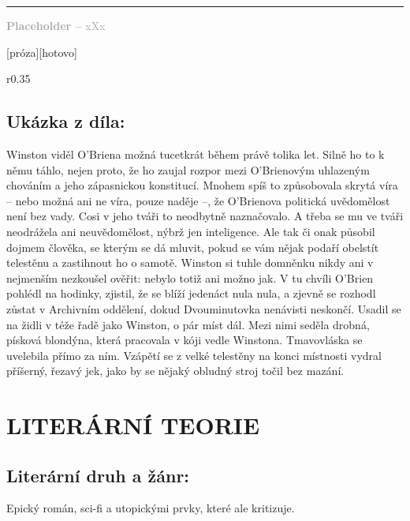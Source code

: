 \documentclass{extarticle} %
\begin{document}
\vfill

\noindent\begin{minipage}{\textwidth}
    \textcolor{darkgray}{\rule{\linewidth}{0.4pt}
    \footnotesize
    \textbf{Placeholder --} xXx
    }
\end{minipage}

\newpage


\changefontsize{7pt}

[próza][hotovo]

\noindent\begin{wrapfigure}{r}{0.35\textwidth}
\tiny

\subsection*{Ukázka z díla:}
\setlength{\parindent}{3pt}\setlength{\parskip}{0.5em}
Winston viděl O’Briena možná tucetkrát během právě tolika let. Silně ho to k němu táhlo, nejen proto, že ho zaujal rozpor mezi O’Brienovým uhlazeným chováním a jeho zápasnickou konstitucí. Mnohem spíš to způsobovala skrytá víra – nebo možná ani ne víra, pouze naděje –, že O’Brienova politická uvědomělost není bez vady. Cosi v jeho tváři to neodbytně naznačovalo. A třeba se mu ve tváři neodrážela ani neuvědomělost, nýbrž jen inteligence. Ale tak či onak působil dojmem člověka, se kterým se dá mluvit, pokud se vám nějak podaří obelstít telestěnu a zastihnout ho o samotě. Winston si tuhle domněnku nikdy ani v nejmenším nezkoušel ověřit: nebylo totiž ani možno jak. V tu chvíli O’Brien pohlédl na hodinky, zjistil, že se blíží jedenáct nula nula, a zjevně se rozhodl zůstat v Archivním oddělení, dokud Dvouminutovka nenávisti neskončí. Usadil se na židli v téže řadě jako Winston, o pár míst dál. Mezi nimi seděla drobná, písková blondýna, která pracovala v kóji vedle Winstona. Tmavovláska se uvelebila přímo za ním. Vzápětí se z velké telestěny na konci místnosti vydral příšerný, řezavý jek, jako by se nějaký obludný stroj točil bez mazání.
\end{wrapfigure}

\section*{LITERÁRNÍ TEORIE}

\subsection*{Literární druh a žánr:}
\noindent 
Epický román, sci-fi a utopickými prvky, které ale kritizuje.
\end{document}
